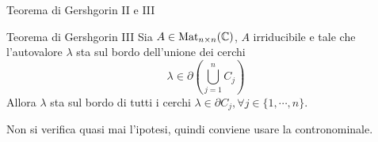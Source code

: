 \documentclass[a4paper]{article}
\begin{document}
\begin{radioactive}
\begin{snippetexample}{Teorema di Gershgorin II e III}
\begin{center}
        \end{center}
        \wrapfill
    \end{snippetexample}
\end{radioactive}

\begin{snippettheorem}{Teorema di Gershgorin III}
    Sia \(A \in \operatorname{Mat}_{n \times n}(\mathbb{C})\),
    \(A\) irriducibile e tale che
    l'autovalore \(\lambda\) sta sul bordo dell'unione dei cerchi
    \[
        \lambda \in \partial \left(\bigcup_{j=1}^n C_j\right)
    \]
    Allora \(\lambda\) sta sul bordo di tutti i cerchi
    \(\lambda \in \partial C_j, \forall j \in \{1, \cdots, n\}\).
\end{snippettheorem}

Non si verifica quasi mai l'ipotesi, quindi conviene usare la contronominale.
\end{document}
